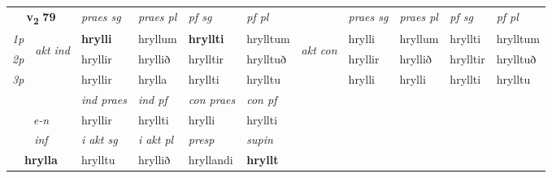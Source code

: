 \noindent
\begin{tabular}{lllllllllll} \toprule
\multicolumn{2}{c}{\textbf{v{\textsubscript{2}}} \Large{\textbf{79}}}  &  \textit{praes sg}  & \textit{praes pl}  &\textit{ pf sg} & \textit{pf pl} &  &  \textit{praes sg}  & \textit{praes pl}  & \textit{pf sg} & \textit{pf pl } \\*
	\cmidrule{3-6} \cmidrule{8-11}
 {\textit{1p}} & \multirow{3}{*}{\begin{turn}{90}\textit{akt ind}\end{turn}} & \textbf{hrylli} & hryllum & \textbf{hryllti} & hrylltum & \multirow{3}{*}{\begin{turn}{90}\textit{akt con}\end{turn}} &hrylli & hryllum & hryllti & hrylltum\\*
 {\textit{2p}} &  &  hryllir  & hryllið & hrylltir & hrylltuð & & hryllir & hryllið & hrylltir & hrylltuð \\*
{\textit{3p}} &  & hryllir & hrylla & hryllti & hrylltu & & hrylli & hrylli& hryllti & hrylltu \\*
\cmidrule{3-6} \cmidrule{8-11}

   & &  \textit{ind praes} & \textit{ind pf} & \textit{con praes} & \textit{con pf} \\*
\multicolumn{2}{c}{ \textit{e-n} } & hryllir & hryllti & hrylli & hryllti \\*

\cmidrule{3-6}
   \multicolumn{2}{c}{\textit{inf}}  & \textit{i akt sg} & \textit{i akt pl}   & \textit{presp} & \textit{supin}   \\*
  \multicolumn{2}{c}{\textbf{hrylla}} & hrylltu  & hryllið   & hryllandi &  \textbf{hryllt}   \\*
\end{tabular}

